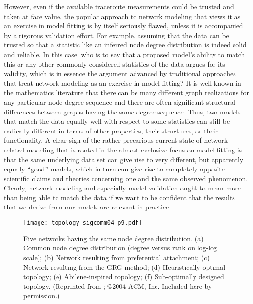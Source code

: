 However, even if the available traceroute measurements could be trusted and taken 
at face value, the popular approach to network modeling that views it as an exercise
in model fitting is by itself seriously flawed, unless it is accompanied by a rigorous
validation effort.  For example, assuming that the data can be trusted so that
a statistic like an inferred node degree distribution is indeed solid and reliable.
In this case, who is to say that a proposed model's ability to match this or any other 
commonly considered statistics of the data argues for its validity, which is in
essence the argument advanced by traditional approaches that treat network modeling
as an exercise in model fitting?  It is well known in the mathematics literature 
that there can be many different graph realizations for any particular node degree sequence
and there are often significant structural differences between graphs having
the same degree sequence. Thus, two models that match the data equally well with 
respect to some statistics can still be radically different in terms of other properties, 
their structures, or their functionality. A clear sign of the rather precarious
current state of network-related modeling that is rooted in the almost exclusive focus
on model fitting is that the same underlying data set can give rise to very
different, but apparently equally ``good'' models, which in turn can give rise to completely 
opposite scientific claims and theories concerning one and the same observed phenomenon.
Clearly, network modeling and especially model validation ought to mean more
than being able to match the data if we want to be confident that the results that we 
derive from our models are relevant in practice.

\begin{figure}[thbp] 
  \begin{center}
    
    \texttt{[image: topology-sigcomm04-p9.pdf]}
   
    \caption{
      Five networks having the same node degree distribution. (a) Common node degree
	 distribution (degree versus rank on log-log scale); (b) Network resulting from 
	 preferential attachment; (c) Network resulting from the GRG method; (d) Heuristically 
	 optimal topology; (e) Abilene-inspired topology; (f) Sub-optimally designed topology.
	 (Reprinted from \cite{Li04}; \copyright 2004 ACM, Inc. Included here by permission.)
\label{fig:node_degree}}
  \end{center}
\end{figure}         
 
